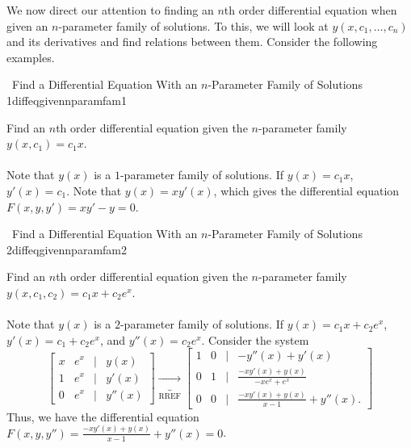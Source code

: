         We now direct our attention to finding an \(n\)th order differential equation when given an \(n\)-parameter family of solutions. To this, we will look at \(y(x,c_1,\ldots,c_n)\) and its derivatives and find relations between them. Consider the following examples.
        \begin{example}{\Difficulty\,\Difficulty\,\,Find a Differential Equation With an \(n\)-Parameter Family of Solutions 1}{diffeqgivennparamfam1}
            
            Find an \(n\)th order differential equation given the \(n\)-parameter family \(y(x,c_1)=c_1x\).
            \\
            \\
            Note that \(y(x)\) is a \(1\)-parameter family of solutions. If \(y(x)=c_1x\), \(y'(x)=c_1\). Note that \(y(x)=xy'(x)\), which gives the differential equation \(F(x,y,y')=xy'-y=0\).

        \end{example}
        \begin{example}{\Difficulty\,\Difficulty\,\,Find a Differential Equation With an \(n\)-Parameter Family of Solutions 2}{diffeqgivennparamfam2}
            
            Find an \(n\)th order differential equation given the \(n\)-parameter family \(y(x,c_1,c_2)=c_1x+c_2e^x\).
            \\
            \\
            Note that \(y(x)\) is a \(2\)-parameter family of solutions. If \(y(x)=c_1x+c_2e^x\), \(y'(x)=c_1+c_2e^x\), and \(y''(x)=c_2e^x\). Consider the system
            \begin{equation*}
                \begin{bmatrix}
                    x & e^x & | & y(x) \\
                    1 & e^x & | & y'(x) \\
                    0 & e^x & | & y''(x)
                \end{bmatrix}\underbrace{\to}_{\text{RREF}}
                \begin{bmatrix}
                    1 & 0 & | & -y''(x)+y'(x) \\
                    0 & 1 & | & \frac{-xy'(x)+y(x)}{-xe^x+e^x} \\
                    0 & 0 & | & \frac{-xy'(x)+y(x)}{x-1}+y''(x).
                \end{bmatrix}
            \end{equation*}
            Thus, we have the differential equation \(F(x,y,y'')=\frac{-xy'(x)+y(x)}{x-1}+y''(x)=0\).
        \end{example}
